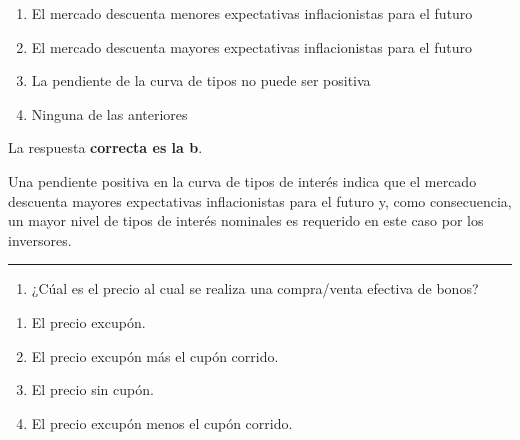 \documentclass[
  letterpaper,
  DIV=11,
  numbers=noendperiod]{scrreprt}
\providecommand{\tightlist}{%
  \setlength{\itemsep}{0pt}\setlength{\parskip}{0pt}}\usepackage{longtable,booktabs,array}
\begin{document}
\begin{enumerate}
\def\labelenumi{\alph{enumi})}
\item
  El mercado descuenta menores expectativas inflacionistas para el
  futuro
\item
  El mercado descuenta mayores expectativas inflacionistas para el
  futuro
\item
  La pendiente de la curva de tipos no puede ser positiva
\item
  Ninguna de las anteriores
\end{enumerate}

\begin{tcolorbox}[enhanced jigsaw, left=2mm, opacityback=0, colback=white, breakable, arc=.35mm, bottomrule=.15mm, rightrule=.15mm, toprule=.15mm, leftrule=.75mm, colframe=quarto-callout-tip-color-frame]
\begin{minipage}[t]{5.5mm}
\textcolor{quarto-callout-tip-color}{\faLightbulb}
\end{minipage}%
\begin{minipage}[t]{\textwidth - 5.5mm}

La respuesta \textbf{correcta es la b}.

Una pendiente positiva en la curva de tipos de interés indica que el
mercado descuenta mayores expectativas inflacionistas para el futuro y,
como consecuencia, un mayor nivel de tipos de interés nominales es
requerido en este caso por los inversores.

\end{minipage}%
\end{tcolorbox}

\begin{center}\rule{0.5\linewidth}{0.5pt}\end{center}

\begin{enumerate}
\def\labelenumi{\arabic{enumi}.}
\setcounter{enumi}{81}
\tightlist
\item
  ¿Cúal es el precio al cual se realiza una compra/venta efectiva de
  bonos?
\end{enumerate}

\begin{enumerate}
\def\labelenumi{\alph{enumi})}
\item
  El precio excupón.
\item
  El precio excupón más el cupón corrido.
\item
  El precio sin cupón.
\item
  El precio excupón menos el cupón corrido.
\end{enumerate}
\end{document}
